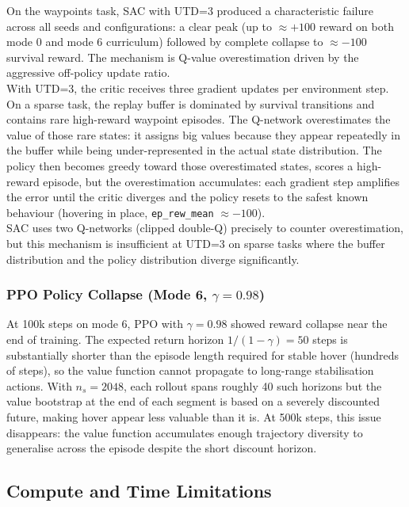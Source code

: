 \documentclass[11pt,a4paper]{article}
\begin{document}
On the waypoints task, SAC with UTD=3 produced a characteristic failure across all seeds and configurations: a clear peak (up to $\approx +100$ reward on both mode 0 and mode 6 curriculum) followed by complete collapse to $\approx -100$ survival reward. The mechanism is Q-value overestimation driven by the aggressive off-policy update ratio. \\

With UTD=3, the critic receives three gradient updates per environment step. On a sparse task, the replay buffer is dominated by survival transitions and contains rare high-reward waypoint episodes. The Q-network overestimates the value of those rare states: it assigns big values because they appear repeatedly in the buffer while being under-represented in the actual state distribution. The policy then becomes greedy toward those overestimated states, scores a high-reward episode, but the overestimation accumulates: each gradient step amplifies the error until the critic diverges and the policy resets to the safest known behaviour (hovering in place, \texttt{ep\_rew\_mean} $\approx -100$). \\

SAC uses two Q-networks (clipped double-Q) precisely to counter overestimation, but this mechanism is insufficient at UTD=3 on sparse tasks where the buffer distribution and the policy distribution diverge significantly.

\subsubsection{PPO Policy Collapse (Mode 6, $\gamma=0.98$)}

At 100k steps on mode 6, PPO with $\gamma=0.98$ showed reward collapse near the end of training. The expected return horizon $1/(1-\gamma) = 50$ steps is substantially shorter than the episode length required for stable hover (hundreds of steps), so the value function cannot propagate to long-range stabilisation actions. With $n_s=2048$, each rollout spans roughly 40 such horizons but the value bootstrap at the end of each segment is based on a severely discounted future, making hover appear less valuable than it is. At 500k steps, this issue disappears: the value function accumulates enough trajectory diversity to generalise across the episode despite the short discount horizon.

\subsection{Compute and Time Limitations}
\end{document}
